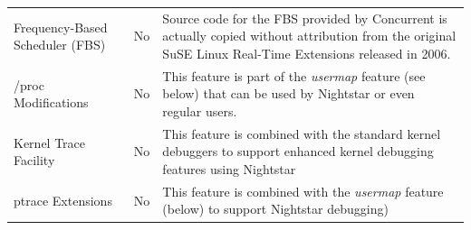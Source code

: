 \documentclass[12pt]{article}
\begin{document}
\begin{table}[H]
{\begin{tabular}{p{2.8in}p{1.2in}p{3.6in}}
Frequency-Based Scheduler (FBS) & No & Source code for the FBS provided by Concurrent is actually copied without attribution from the original SuSE Linux Real-Time Extensions released in 2006. \\
/proc Modifications & No & This feature is part of the \emph{usermap} feature (see below) that can be used by Nightstar or even regular users.\\
Kernel Trace Facility & No & This feature is combined with the standard kernel debuggers to support enhanced kernel debugging features using Nightstar \\
ptrace Extensions & No & This feature is combined with the \emph{usermap} feature (below) to support Nightstar debugging) \\
    \hline
    \end{tabular}%
    }
    \label{tab:redhawk_features_1}
\end{table}
\end{document}
